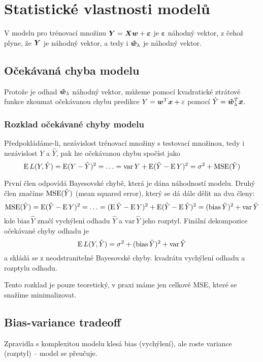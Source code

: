\documentclass[../main.tex]{subfiles}
\begin{document}
\section{Statistické vlastnosti modelů}

V modelu pro trénovací množinu $\bm{Y} = \bm{X}\bm{w} + \bm{\varepsilon}$ je $\bm{\varepsilon}$ náhodný vektor, z čehož plyne, že $\bm{Y}$ je náhodný vektor, a tedy i $\bm{\hat{w}}_\lambda$ je náhodný vektor.

\subsection{Očekávaná chyba modelu}

Protože je odhad $\bm{\hat{w}}_\lambda$ náhodný vektor, můžeme pomocí kvadratické ztrátové funkce zkoumat očekávanou chybu predikce $Y = \bm{w}^T\bm{x} + \varepsilon$ pomocí $\hat{Y} = \bm{\hat{w}}_\lambda^T \bm{x}$.

\subsubsection{Rozklad očekávané chyby modelu}

Předpokládáme-li, nezávislost trénovací množiny s testovací množinou, tedy i nezávislost $Y$ a $\hat{Y}$, pak lze očekávanou chybu spočíst jako
\[
    \operatorname{E} L(Y, \hat{Y}) = \operatorname{E} (Y - \hat{Y})^2 = \ldots
    = \textrm{var}\,Y + \operatorname{E} (\hat{Y} - \operatorname{E} Y)^2
    = \sigma^2 + \operatorname{MSE}(\hat{Y})
\]

První člen odpovídá Bayesovské chybě, která je dána náhodností modelu. Druhý člen značíme $\operatorname{MSE}(\hat{Y})$ (mean squared error), který se dá dále dělit na dva členy:
\[
    \operatorname{MSE}(\hat{Y}) = \operatorname{E} (\hat{Y} - \operatorname{E} Y)^2 = \ldots
    = (\operatorname{E}\hat{Y} - \operatorname{E} Y)^2 + \operatorname{E}(\hat{Y} - \operatorname{E}\hat{Y})^2
    = (\text{bias}\,\hat{Y})^2 + \text{var}\,\hat{Y}
\]
kde $\text{bias}\,\hat{Y}$ značí vychýlení odhadu $\hat{Y}$ a $\text{var}\,\hat{Y}$ jeho rozptyl. Finální dekompozice očekávané chyby odhadu je
\[
    \operatorname{E} L(Y, \hat{Y}) = \sigma^2 + (\text{bias}\,\hat{Y})^2 + \text{var}\,\hat{Y}
\]
a skládá se z neodstranitelné Bayesovské chyby. kvadrátu vychýlení odhadu a rozptylu odhadu.

Tento rozklad je pouze teoretický, v praxi máme jen celkové MSE, které se snažíme minimalizovat.

\subsection{Bias-variance tradeoff}

Zpravidla s komplexitou modelu klesá bias (vychýlení), ale roste variance (rozptyl) -- model se přeučuje.
\end{document}
